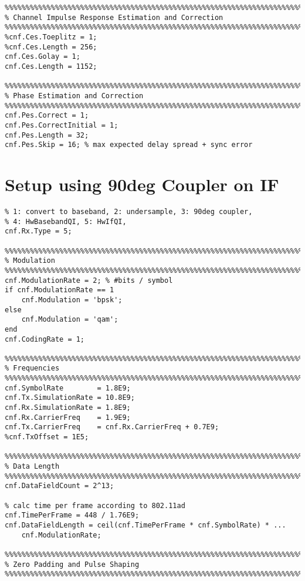 \begin{appendix}
\begin{verbatim}
%%%%%%%%%%%%%%%%%%%%%%%%%%%%%%%%%%%%%%%%%%%%%%%%%%%%%%%%%%%%%%%%%%%%%%%%%%%%%%%%
% Channel Impulse Response Estimation and Correction
%%%%%%%%%%%%%%%%%%%%%%%%%%%%%%%%%%%%%%%%%%%%%%%%%%%%%%%%%%%%%%%%%%%%%%%%%%%%%%%%
%cnf.Ces.Toeplitz = 1;
%cnf.Ces.Length = 256;
cnf.Ces.Golay = 1;
cnf.Ces.Length = 1152;

%%%%%%%%%%%%%%%%%%%%%%%%%%%%%%%%%%%%%%%%%%%%%%%%%%%%%%%%%%%%%%%%%%%%%%%%%%%%%%%%
% Phase Estimation and Correction
%%%%%%%%%%%%%%%%%%%%%%%%%%%%%%%%%%%%%%%%%%%%%%%%%%%%%%%%%%%%%%%%%%%%%%%%%%%%%%%%
cnf.Pes.Correct = 1;
cnf.Pes.CorrectInitial = 1;
cnf.Pes.Length = 32;
cnf.Pes.Skip = 16; % max expected delay spread + sync error
\end{verbatim}

\section{Setup using 90deg Coupler on IF}
\begin{verbatim}
% 1: convert to baseband, 2: undersample, 3: 90deg coupler,
% 4: HwBasebandQI, 5: HwIfQI,
cnf.Rx.Type = 5;

%%%%%%%%%%%%%%%%%%%%%%%%%%%%%%%%%%%%%%%%%%%%%%%%%%%%%%%%%%%%%%%%%%%%%%%%%%%%%%%%
% Modulation
%%%%%%%%%%%%%%%%%%%%%%%%%%%%%%%%%%%%%%%%%%%%%%%%%%%%%%%%%%%%%%%%%%%%%%%%%%%%%%%%
cnf.ModulationRate = 2; % #bits / symbol
if cnf.ModulationRate == 1
    cnf.Modulation = 'bpsk';
else
    cnf.Modulation = 'qam';
end
cnf.CodingRate = 1;

%%%%%%%%%%%%%%%%%%%%%%%%%%%%%%%%%%%%%%%%%%%%%%%%%%%%%%%%%%%%%%%%%%%%%%%%%%%%%%%%
% Frequencies
%%%%%%%%%%%%%%%%%%%%%%%%%%%%%%%%%%%%%%%%%%%%%%%%%%%%%%%%%%%%%%%%%%%%%%%%%%%%%%%%
cnf.SymbolRate        = 1.8E9;
cnf.Tx.SimulationRate = 10.8E9;
cnf.Rx.SimulationRate = 1.8E9;
cnf.Rx.CarrierFreq    = 1.9E9;
cnf.Tx.CarrierFreq    = cnf.Rx.CarrierFreq + 0.7E9;
%cnf.TxOffset = 1E5;

%%%%%%%%%%%%%%%%%%%%%%%%%%%%%%%%%%%%%%%%%%%%%%%%%%%%%%%%%%%%%%%%%%%%%%%%%%%%%%%%
% Data Length
%%%%%%%%%%%%%%%%%%%%%%%%%%%%%%%%%%%%%%%%%%%%%%%%%%%%%%%%%%%%%%%%%%%%%%%%%%%%%%%%
cnf.DataFieldCount = 2^13;

% calc time per frame according to 802.11ad
cnf.TimePerFrame = 448 / 1.76E9;
cnf.DataFieldLength = ceil(cnf.TimePerFrame * cnf.SymbolRate) * ...
    cnf.ModulationRate;

%%%%%%%%%%%%%%%%%%%%%%%%%%%%%%%%%%%%%%%%%%%%%%%%%%%%%%%%%%%%%%%%%%%%%%%%%%%%%%%%
% Zero Padding and Pulse Shaping
%%%%%%%%%%%%%%%%%%%%%%%%%%%%%%%%%%%%%%%%%%%%%%%%%%%%%%%%%%%%%%%%%%%%%%%%%%%%%%%%


\end{verbatim}
\end{appendix}
